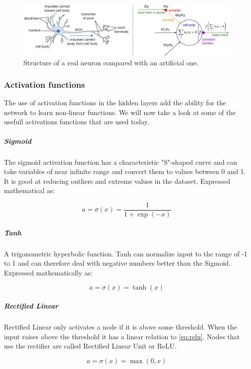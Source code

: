 \begin{figure}[H]
	\centering
	\includegraphics[width=\linewidth]{fig/artificial-neuron.png}
	\caption{Structure of a real neuron compared with an artificial one. \cite{Li}}
	\label{fig:artificial-neuron}
\end{figure}

\subsubsection*{Activation functions}

The use of activation functions in the hidden layers add the ability for the network to learn non-linear functions. We will now take a look at some of the usefull activations functions that are used today.

\subparagraph*{Sigmoid}

The sigmoid activation function has a characteristic "S"-shaped curve and can take variables of near infinite range and convert them to values between 0 and 1. It is good at reducing outliers and extreme values in the dataset. Expressed mathematical as:

\begin{equation}
a = \sigma(x) = \frac{1}{1+\exp(-x)}
\end{equation}


\subparagraph*{Tanh}

A trigonometric hyperbolic function. Tanh can normalize input to the range of -1 to 1 and can therefore deal with negative numbers better than the Sigmoid. Expressed mathematically as:

\begin{equation}
a = \sigma(x) = \tanh(x)
\end{equation}


\subparagraph*{Rectified Linear}

Rectified Linear only activates a node if it is above some threshold. When the input raises above the threshold it has a linear relation to \autoref{eq:relu}. Nodes that use the rectifier are called Rectified Linear Unit or ReLU. 

\begin{equation}
\label{eq:relu}
a = \sigma(x) = \max(0, x)
\end{equation}


